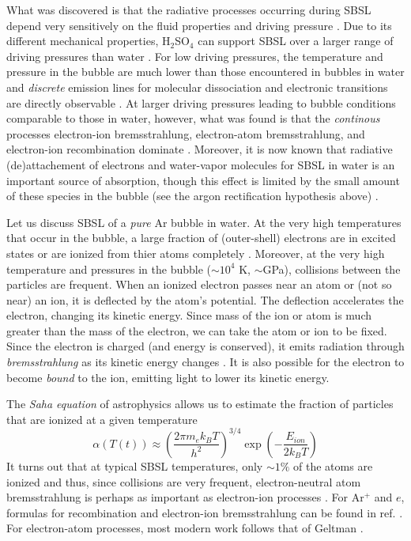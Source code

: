 \documentclass[rmp,aps,nofootinbib,superscriptaddress,floatfix]{revtex4-2}
\begin{document}
What was discovered is that the radiative processes occurring during SBSL depend very sensitively on the fluid properties and driving pressure \cite{flannigan2006measurement,flannigan2005plasma}. Due to its different mechanical properties, H$_2$SO$_4$ can support SBSL over a larger range of driving pressures than water \cite{an2009diagnosing}. For low driving pressures, the temperature and pressure in the bubble are much lower than those encountered in bubbles in water and \emph{discrete} emission lines for molecular dissociation and electronic transitions are directly observable \cite{flannigan2005plasma,flannigan2006measurement}. At larger driving pressures leading to bubble conditions comparable to those in water, however, what was found is that the \emph{continous} processes electron-ion bremsstrahlung, electron-atom bremsstrahlung, and electron-ion recombination dominate \cite{hilgenfeldt1999simple,yasui2018acoustic,suslick2008inside,zel2002physics}. Moreover, it is now known that radiative (de)attachement of electrons and water-vapor molecules for SBSL in water is an important source of absorption, though this effect is limited by the small amount of these species in the bubble (see the argon rectification hypothesis above) \cite{an2006mechanism}. 

Let us discuss SBSL of a \emph{pure} Ar bubble in water. At the very high temperatures that occur in the bubble, a large fraction of (outer-shell) electrons are in excited states or are ionized from thier atoms completely \cite{zel2002physics}. Moreover, at the very high temperature and pressures in the bubble ($\sim 10^4$ K, $\sim$GPa), collisions between the particles are frequent. When an ionized electron passes near an atom or (not so near) an ion, it is deflected by the atom's potential. The deflection accelerates the electron, changing its kinetic energy. Since mass of the ion or atom is much greater than the mass of the electron, we can take the atom or ion to be fixed. Since the electron is charged (and energy is conserved), it emits radiation through \emph{bremsstrahlung} as its kinetic energy changes \cite{jackson1999classical,zel2002physics}. It is also possible for the electron to become \emph{bound} to the ion, emitting light to lower its kinetic energy.

The \emph{Saha equation} of astrophysics allows us to estimate the fraction of particles that are ionized at a given temperature \cite{hilgenfeldt1999simple,an2006mechanism,zel2002physics}
\begin{equation}
    \alpha(T(t)) \approx \left( \frac{2 \pi m_e k_B T}{h^2} \right)^{3/4} \exp \left(-\frac{E_{ion}}{2 k_B T} \right)
\end{equation}
It turns out that at typical SBSL temperatures, only $\sim 1\%$ of the atoms are ionized and thus, since collisions are very frequent, electron-neutral atom bremsstrahlung is perhaps as important as electron-ion processes \cite{hilgenfeldt1999simple,an2006mechanism,flannigan2005plasma}. For Ar$^+$ and $e$, formulas for recombination and electron-ion bremsstrahlung can be found in ref. \cite{hilgenfeldt1999simple}. For electron-atom processes, most modern work follows that of Geltman \cite{geltman1973free,an2006mechanism,an2008spectral}.
\end{document}
